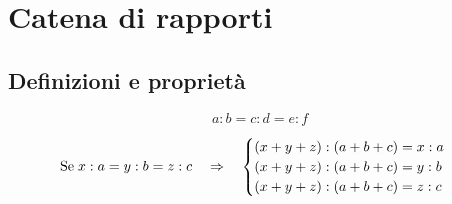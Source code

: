 \chapter{Catena di rapporti}
\section{Definizioni e proprietà}
\begin{defn}
	\begin{equation*}
	a:b=c:d=e:f
	\end{equation*}
\end{defn}
\begin{prop}
\begin{equation*}                       
\text{Se\;}x:a=y:b=z:c\quad\Rightarrow\quad \begin{cases}
(x+y+z):(a+b+c)=x:a\\
(x+y+z):(a+b+c)=y:b\\
(x+y+z):(a+b+c)=z:c
\end{cases}
\end{equation*}
\end{prop}



